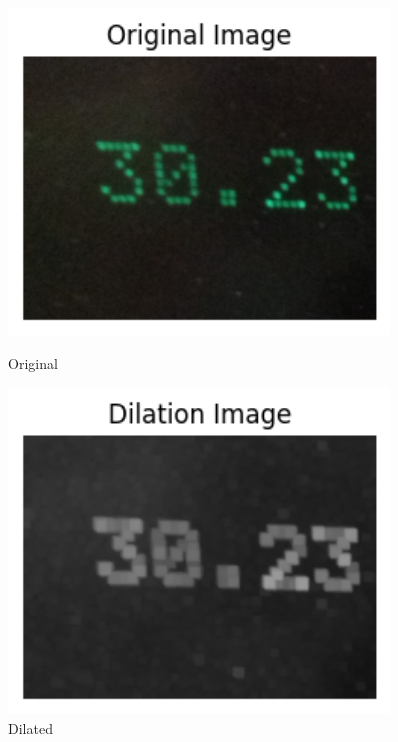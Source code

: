 \begin{figure}[h]
    \centering
    \begin{minipage}{0.30\textwidth}
        \centering
        \includegraphics[width=0.9\textwidth]{Figures/closing/original.png}
        \caption*{Original}
    \end{minipage}\hfill
    \begin{minipage}{0.30\textwidth}
        \centering
        \includegraphics[width=0.9\textwidth]{Figures/closing/dilated.png}
        \caption*{Dilated}
    \end{minipage}\hfill
    \begin{minipage}{0.30\textwidth}
        \centering

\end{minipage}
\end{figure}
